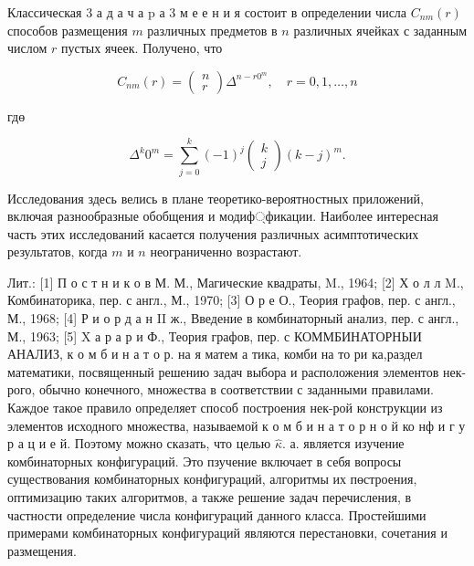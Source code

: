 \documentclass[10pt]{article}
\begin{document}
Классическая 3 а д а ч а $\mathrm{p}$ а 3 м е е н и я состоит в определении числа $C_{n m}(r)$ способов размещения $m$ различных предметов в $n$ различных ячейках с заданным числом $r$ пустых ячеек. Получено, что



\[

C_{n m}(r)=\left(\begin{array}{l}

n \\

r

\end{array}\right) \Delta^{n-r 0^{m}}, \quad r=0,1, \ldots, n

\]



гдө



\[

\Delta^{k} 0^{m}=\sum_{j=0}^{k}(-1)^{j}\left(\begin{array}{l}

k \\

j

\end{array}\right)(k-j)^{m} .

\]



Исследования здесь велись в плане теоретико-вероятностных приложений, включая разнообразные обобщения и модиф্фикации. Наиболее интересная часть этих исследований касается получения различных асимптотических результатов, когда $m$ и $n$ неограниченно возрастают.



Лит.: [1] П о с т н и к о в М. М., Магические квадраты, M., 1964; [2] Х о л л M., Комбинаторика, пер. с англ., М., 1970; [3] О р е О., Теория графов, пер. с англ., М., 1968; [4] Р и о р д а н II ж., Введение в комбинаторный анализ, пер. с англ., М., 1963; [5] X а р а р и Ф., Теория графов, пер. с КОММБИНАТОРНЫИ АНАЛИЗ, к о м б и н а т о р. на я матем а тика, комби на то ри ка,раздел математики, посвященный решению задач выбора и расположения элементов нек-рого, обычно конечного, множества в соответствии с заданными правилами. Каждое такое правило определяет способ построения нек-рой конструкции из элементов исходного множества, называемой к о м б и н а т о р н о й ко нф и г у р а ц и е й. Поэтому можно сказать, что целью $\hat{\kappa}$. а. является изучение комбинаторных конфигураций. Это пзучение включает в себя вопросы существования комбинаторных конфигураций, алгоритмы их пөстроения, оптимизацию таких алгоритмов, а также решение задач перечисления, в частности определение числа конфигураций данного класса. Простейшими примерами комбинаторных конфигураций являются перестановки, сочетания и размещения.
\end{document}
